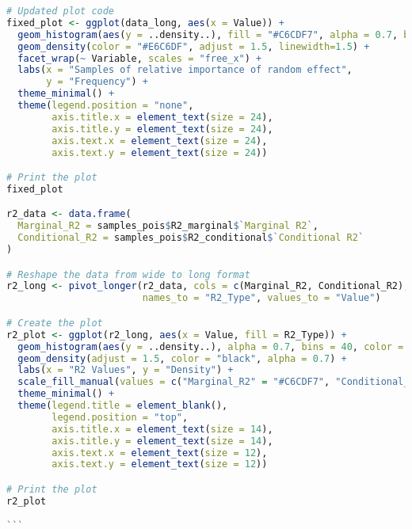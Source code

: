 \begin{lstlisting}[language=R, caption=Usage of the BayesianImpGLMM package with plots and examples.]
# Updated plot code
fixed_plot <- ggplot(data_long, aes(x = Value)) +
  geom_histogram(aes(y = ..density..), fill = "#C6CDF7", alpha = 0.7, bins = 40, color = "black") +
  geom_density(color = "#E6C6DF", adjust = 1.5, linewidth=1.5) +
  facet_wrap(~ Variable, scales = "free_x") +
  labs(x = "Samples of relative importance of random effect",
       y = "Frequency") +
  theme_minimal() +
  theme(legend.position = "none",
        axis.title.x = element_text(size = 24),
        axis.title.y = element_text(size = 24),
        axis.text.x = element_text(size = 24),
        axis.text.y = element_text(size = 24))

# Print the plot
fixed_plot

r2_data <- data.frame(
  Marginal_R2 = samples_pois$R2_marginal$`Marginal R2`,
  Conditional_R2 = samples_pois$R2_conditional$`Conditional R2`
)

# Reshape the data from wide to long format
r2_long <- pivot_longer(r2_data, cols = c(Marginal_R2, Conditional_R2),
                        names_to = "R2_Type", values_to = "Value")

# Create the plot
r2_plot <- ggplot(r2_long, aes(x = Value, fill = R2_Type)) +
  geom_histogram(aes(y = ..density..), alpha = 0.7, bins = 40, color = "black") +
  geom_density(adjust = 1.5, color = "black", alpha = 0.7) +
  labs(x = "R2 Values", y = "Density") +
  scale_fill_manual(values = c("Marginal_R2" = "#C6CDF7", "Conditional_R2" = "#E6C6DF")) +
  theme_minimal() +
  theme(legend.title = element_blank(),
        legend.position = "top",
        axis.title.x = element_text(size = 14),
        axis.title.y = element_text(size = 14),
        axis.text.x = element_text(size = 12),
        axis.text.y = element_text(size = 12))

# Print the plot
r2_plot

```
\end{lstlisting}